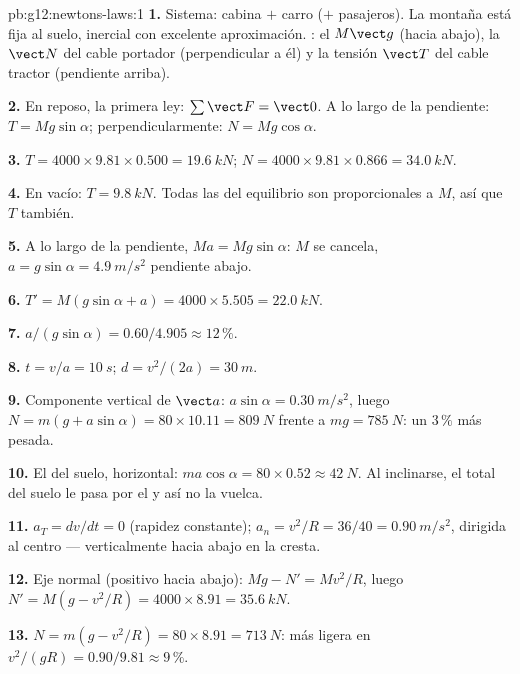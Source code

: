 \begin{solution}{pb:g12:newtons-laws:1}
\textbf{1.} Sistema: cabina $+$ carro ($+$ pasajeros). La montaña está
fija al suelo, inercial con excelente aproximación. : el 
$M\vect g$ (hacia abajo), la  $\vect N$ del cable portador
(perpendicular a él) y la tensión $\vect T$ del cable tractor (pendiente
arriba).

\textbf{2.} En reposo, la primera ley: $\sum \vect F = \vect 0$. A lo
largo de la pendiente: $T = Mg\sin\alpha$; perpendicularmente:
$N = Mg\cos\alpha$.

\textbf{3.} $T = 4000 \times 9.81 \times 0.500 = \qty{19.6}{kN}$;
$N = 4000 \times 9.81 \times 0.866 = \qty{34.0}{kN}$.

\textbf{4.} En vacío: $T = \qty{9.8}{kN}$. Todas las  del
equilibrio son proporcionales a $M$, así que $T$ también.

\textbf{5.} A lo largo de la pendiente, $Ma = Mg\sin\alpha$: $M$ se
cancela, $a = g\sin\alpha = \qty{4.9}{m/s^2}$ pendiente abajo.

\textbf{6.} $T' = M(g\sin\alpha + a) = 4000 \times 5.505 =
\qty{22.0}{kN}$.

\textbf{7.} $a/(g\sin\alpha) = 0.60/4.905 \approx 12\,\%$.

\textbf{8.} $t = v/a = \qty{10}{s}$; $d = v^2/(2a) = \qty{30}{m}$.

\textbf{9.} Componente vertical de $\vect a$:
$a\sin\alpha = \qty{0.30}{m/s^2}$, luego
$N = m(g + a\sin\alpha) = 80 \times 10.11 = \qty{809}{N}$ frente a
$mg = \qty{785}{N}$: un $3\,\%$ más pesada.

\textbf{10.} El  del suelo, horizontal:
$ma\cos\alpha = 80 \times 0.52 \approx \qty{42}{N}$. Al inclinarse, el
 total del suelo le pasa por el  y así no la
vuelca.

\textbf{11.} $a_T = dv/dt = 0$ (rapidez constante);
$a_n = v^2/R = 36/40 = \qty{0.90}{m/s^2}$, dirigida al centro ---
verticalmente hacia abajo en la cresta.

\textbf{12.} Eje normal (positivo hacia abajo): $Mg - N' = Mv^2/R$,
luego $N' = M(g - v^2/R) = 4000 \times 8.91 = \qty{35.6}{kN}$.

\textbf{13.} $N = m(g - v^2/R) = 80 \times 8.91 = \qty{713}{N}$: más
ligera en $v^2/(gR) = 0.90/9.81 \approx 9\,\%$.


\end{solution}
